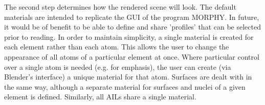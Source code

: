 \documentclass{report}
\begin{document}
The second step determines how the rendered scene will look.
The default materials are intended to replicate the GUI of the program MORPHY.
In future, it would be of benefit to be able to define and share 'profiles' that can be selected prior to reading.
In order to maintain simplicity, a single material is created for each element rather than each atom.
This allows the user to change the appearance of all atoms of a particular element at once.
Where particular control over a single atom is needed (e.g. for emphasis), the user can create (via Blender's interface) a unique material for that atom.
Surfaces are dealt with in the same way, although a separate material for surfaces and nuclei of a given element is defined.
Similarly, all AILs share a single material.
\end{document}
